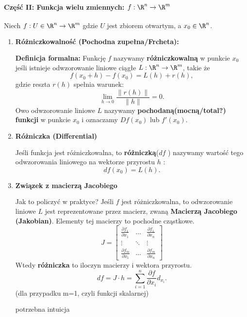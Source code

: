 \paragraph{Część II: Funkcja wielu zmiennych: $f: \R^{n}\to \R^{m}$}

Niech $f: U\in \R^{n}\to \R^{m}$ gdzie $U$ jest zbiorem otwartym, a $x_0 \in \R^{n}$.
\begin{enumerate}[label=\arabic*.]
	\item \textbf{Różniczkowalność (Pochodna zupełna/Frcheta):}

		\textbf{Definicja formalna:} Funkcję $f$ nazywamy \textbf{różniczkowalną} w punkcie $x_0$ jeśli istnieje odwzorowanie liniowe ciągłe $L: \R^{n}\to \R^{m}$, takie że
		\[
		f\left( x_0 + h \right) - f\left( x_0 \right) = L\left( h \right) + r(h)
		,\] 
		gdzie reszta $r(h)$ spełnia warunek:
		\[
		\lim_{h \to 0} \frac{\|r\left( h \right) \|}{\|h\|}= 0
		.\] 
		Owo odwzorowanie liniowe $L$ nazywamy \textbf{pochodaną(mocną/total?) funkcji }  w punkcie $x_0$ i oznaczamy $Df\left( x_0 \right) $ lub $f'(x_0)$.
	\item \textbf{Różniczka (Differential)} 
		
		Jeśli funkcja jest różniczkowalna, to \textbf{różniczką}($df$ ) nazywamy wartość tego odwzorowania liniowego na wektorze przyrostu
		$h$ :
		\[
		df\left( x_0 \right) = L\left( h \right) 
		.\] 
	\item \textbf{Związek z macierzą Jacobiego} 

		Jak to policzyć w praktyce? Jeśli $f$ jest różniczkowalna, to odwzorowanie liniowe $L$ jest reprezentowane przez macierz, zwaną \textbf{Macierzą Jacobiego (Jakobian)}. Elementy tej macierzy to pochodne cząstkowe.
		\[
			J =
		\begin{bmatrix} 
			\frac{\partial f_1}{\partial x_1} &\ldots & \frac{\partial f_{1}}{\partial x_{n}} \\
			\vdots & \ddots & \vdots \\
			\frac{\partial f_{m}}{\partial x_{1}}&  \hdots & \frac{\partial f_{m}}{\partial x_{n}} 
		\end{bmatrix} 
		\] 
Wtedy \textbf{różniczka} to iloczyn macierzy i wektora przyrostu.
\[
df = J\cdot h = \sum_{i=1}^{n} \frac{\partial f}{\partial x_{i}}d_{x_{i}} 
.\] 
(dla przypadku m=1, czyli funkcji skalarnej)
\begin{remark}
	potrzebna intuicja
\end{remark} 
\end{enumerate}


